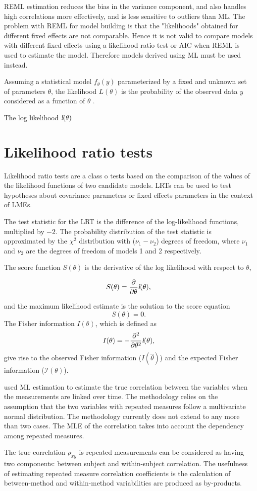 \documentclass[12pt, a4paper]{report}
\begin{document}
REML estimation reduces the bias in the variance component, and also handles high correlations
more effectively, and is less sensitive to outliers than ML.  The problem with REML for model building is that the "likelihoods" obtained for different fixed effects are not comparable. Hence it is not valid to compare models
with different fixed effects using a likelihood ratio test or AIC when REML is used to
estimate the model. Therefore models derived using ML must be used instead.
\newpage



\newpage
Assuming a statistical model $f_{\theta}(y)$ parameterized by a fixed and unknown set of parameters $\theta$, the likelihood $L(\theta)$ is the probability of the observed data $y$ considered as a function of $\theta$ \citep{youngjo}.

The log likelihood $\emph{l}(\theta)$

\newpage
\section{Likelihood ratio tests}
Likelihood ratio tests are  a class o tests based on the
comparison of the values of the likelihood functions of two
candidate models. LRTs can be used to test hypotheses about
covariance parameters or fixed effects parameters in the context
of LMEs.

The test statistic for the LRT is the difference of the log-likelihood functions, multiplied by $-2$.
The probability distribution of the test statistic is approximated by the $\chi^2$ distribution with ($\nu_{1} - \nu_{2}$) degrees of freedom, where $\nu_{1}$  and $\nu_{2}$ are the degrees of freedom of models 1 and 2 respectively.

The score function $S(\theta)$ is the derivative of the log likelihood with respect to $\theta$,

\[
S(\theta) = \frac{\partial}{\partial \theta}\emph{l}(\theta),
\]

and the maximum likelihood estimate is the solution to the score equation
\[
S(\theta) = 0.
\]
The Fisher information $I(\theta)$, which is defined as
\[
I(\theta) = - \frac{\partial^2}{\partial \theta^2}\emph{l}(\theta),
\]
give rise to the observed Fisher information ($I(\hat{\theta})$) and the expected Fisher information ($\mathcal{I}(\theta)$).


\newpage
\citet{Lam} used ML estimation to estimate the true correlation between the variables when
the measurements are linked over time. The methodology relies on the assumption that the two variables with repeated measures follow a multivariate normal distribution. The methodology currently does not extend to any more than two cases. The MLE of the correlation takes into account the dependency among repeated measures.

The true correlation $\rho_{xy}$ is repeated measurements can be considered as having two components: between subject and within-subject correlation. The usefulness of estimating repeated measure correlation coefficients is the calculation of between-method and within-method variabilities are produced as by-products.
\end{document}
